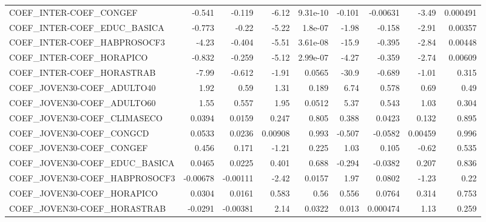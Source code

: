 \begin{tabular}{lrrrrrrrr}
COEF\_INTER-COEF\_CONGEF                &      -0.541 &       -0.119 &   -6.12 & 9.31e-10 &     -0.101 &    -0.00631 &        -3.49 &      0.000491 \\
COEF\_INTER-COEF\_EDUC\_BASICA           &      -0.773 &        -0.22 &   -5.22 &  1.8e-07 &      -1.98 &      -0.158 &        -2.91 &       0.00357 \\
COEF\_INTER-COEF\_HABPROSOCF3           &       -4.23 &       -0.404 &   -5.51 & 3.61e-08 &      -15.9 &      -0.395 &        -2.84 &       0.00448 \\
COEF\_INTER-COEF\_HORAPICO              &      -0.832 &       -0.259 &   -5.12 & 2.99e-07 &      -4.27 &      -0.359 &        -2.74 &       0.00609 \\
COEF\_INTER-COEF\_HORASTRAB             &       -7.99 &       -0.612 &   -1.91 &   0.0565 &      -30.9 &      -0.689 &        -1.01 &         0.315 \\
COEF\_JOVEN30-COEF\_ADULTO40            &        1.92 &         0.59 &    1.31 &    0.189 &       6.74 &       0.578 &         0.69 &          0.49 \\
COEF\_JOVEN30-COEF\_ADULTO60            &        1.55 &        0.557 &    1.95 &   0.0512 &       5.37 &       0.543 &         1.03 &         0.304 \\
COEF\_JOVEN30-COEF\_CLIMASECO           &      0.0394 &       0.0159 &   0.247 &    0.805 &      0.388 &      0.0423 &        0.132 &         0.895 \\
COEF\_JOVEN30-COEF\_CONGCD              &      0.0533 &       0.0236 & 0.00908 &    0.993 &     -0.507 &     -0.0582 &      0.00459 &         0.996 \\
COEF\_JOVEN30-COEF\_CONGEF              &       0.456 &        0.171 &   -1.21 &    0.225 &       1.03 &       0.105 &        -0.62 &         0.535 \\
COEF\_JOVEN30-COEF\_EDUC\_BASICA         &      0.0465 &       0.0225 &   0.401 &    0.688 &     -0.294 &     -0.0382 &        0.207 &         0.836 \\
COEF\_JOVEN30-COEF\_HABPROSOCF3         &    -0.00678 &     -0.00111 &   -2.42 &   0.0157 &       1.97 &      0.0802 &        -1.23 &          0.22 \\
COEF\_JOVEN30-COEF\_HORAPICO            &      0.0304 &       0.0161 &   0.583 &     0.56 &      0.556 &      0.0764 &        0.314 &         0.753 \\
COEF\_JOVEN30-COEF\_HORASTRAB           &     -0.0291 &     -0.00381 &    2.14 &   0.0322 &      0.013 &    0.000474 &         1.13 &         0.259 \\

\end{tabular}
